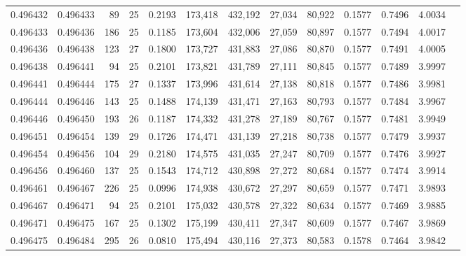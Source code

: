 \begin{tabular}{rrrrrrrrrrrrr}
0.496432 & 0.496433 &  89 &  25 &                                     0.2193 & 173,418 & 432,192 &  27,034 &  80,922 & 0.1577 & 0.7496 & 4.0034 \\
0.496433 & 0.496436 & 186 &  25 &                                     0.1185 & 173,604 & 432,006 &  27,059 &  80,897 & 0.1577 & 0.7494 & 4.0017 \\
0.496436 & 0.496438 & 123 &  27 &                                     0.1800 & 173,727 & 431,883 &  27,086 &  80,870 & 0.1577 & 0.7491 & 4.0005 \\
0.496438 & 0.496441 &  94 &  25 &                                     0.2101 & 173,821 & 431,789 &  27,111 &  80,845 & 0.1577 & 0.7489 & 3.9997 \\
0.496441 & 0.496444 & 175 &  27 &                                     0.1337 & 173,996 & 431,614 &  27,138 &  80,818 & 0.1577 & 0.7486 & 3.9981 \\
0.496444 & 0.496446 & 143 &  25 &                                     0.1488 & 174,139 & 431,471 &  27,163 &  80,793 & 0.1577 & 0.7484 & 3.9967 \\
0.496446 & 0.496450 & 193 &  26 &                                     0.1187 & 174,332 & 431,278 &  27,189 &  80,767 & 0.1577 & 0.7481 & 3.9949 \\
0.496451 & 0.496454 & 139 &  29 &                                     0.1726 & 174,471 & 431,139 &  27,218 &  80,738 & 0.1577 & 0.7479 & 3.9937 \\
0.496454 & 0.496456 & 104 &  29 &                                     0.2180 & 174,575 & 431,035 &  27,247 &  80,709 & 0.1577 & 0.7476 & 3.9927 \\
0.496456 & 0.496460 & 137 &  25 &                                     0.1543 & 174,712 & 430,898 &  27,272 &  80,684 & 0.1577 & 0.7474 & 3.9914 \\
0.496461 & 0.496467 & 226 &  25 &                                     0.0996 & 174,938 & 430,672 &  27,297 &  80,659 & 0.1577 & 0.7471 & 3.9893 \\
0.496467 & 0.496471 &  94 &  25 &                                     0.2101 & 175,032 & 430,578 &  27,322 &  80,634 & 0.1577 & 0.7469 & 3.9885 \\
0.496471 & 0.496475 & 167 &  25 &                                     0.1302 & 175,199 & 430,411 &  27,347 &  80,609 & 0.1577 & 0.7467 & 3.9869 \\
0.496475 & 0.496484 & 295 &  26 &                                     0.0810 & 175,494 & 430,116 &  27,373 &  80,583 & 0.1578 & 0.7464 & 3.9842 \\

\end{tabular}
